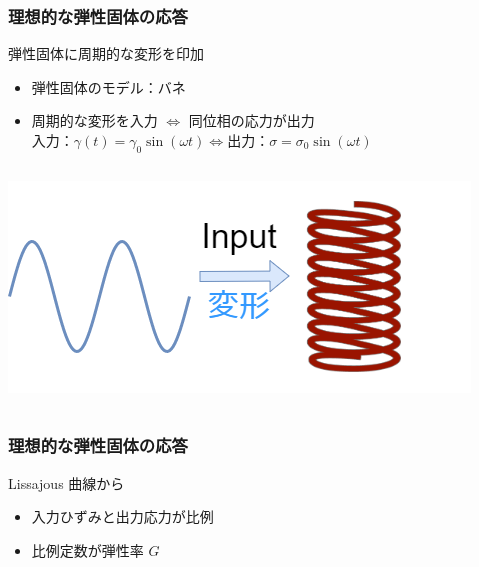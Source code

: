\documentclass[12pt, dvipdfmx]{beamer}
\begin{document}
\begin{frame}
    \frametitle{理想的な弾性固体の応答}
	\begin{block}{弾性固体に周期的な変形を印加}
		\begin{itemize}
			\item 弾性固体のモデル：バネ
			\item 周期的な変形を入力 $\Leftrightarrow$ 同位相の応力が出力\\
			$\text{入力：}\gamma (t) = \gamma_0 \sin(\omega t) \Leftrightarrow \text{出力：}\sigma = \sigma_0 \sin(\omega t)$
		\end{itemize}
	\end{block}
	\begin{columns}[c, onlytextwidth]
			\centering
				\includegraphics[width=\textwidth]{dynamic_Elast.png}
			
			\centering
	\end{columns}
\end{frame}

\begin{frame}
    \frametitle{理想的な弾性固体の応答}
	\begin{block}{Lissajous 曲線から}
		\begin{itemize}
			\item 入力ひずみと出力応力が比例
			\item 比例定数が弾性率 $G$ 
		\end{itemize}
	\end{block}

		\centering
\end{frame}
\end{document}
